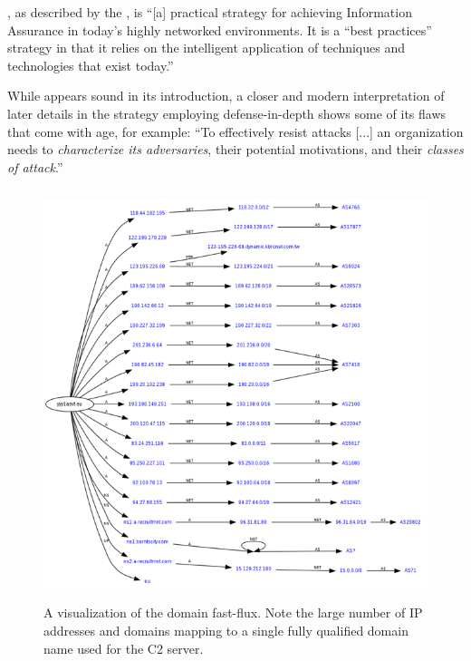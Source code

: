 \documentclass[12pt,letterpaper,titlepage]{report}
\begin{document}
{\didlong \autocite{nsa}, as described by the \nsa, is
“[a] practical strategy for achieving Information Assurance in today's highly
networked environments.  It is a ``best practices'' strategy in that it relies on
the intelligent application of techniques and technologies that exist today.”

While \did appears sound in its introduction, a closer and modern
interpretation of later details in the \nsa strategy employing defense-in-depth
shows some of its flaws that come with age, for example: ``To effectively resist
attacks [...] an organization needs to \emph{characterize its adversaries}, their
potential motivations, and their \emph{classes of attack}.''

\begin{figure}[h!]
	\centering
  \includegraphics[height=12cm]{./fastflux.png}
  \caption{A visualization of the domain fast-flux. Note the large
  number of IP addresses and domains mapping to a single fully qualified
  domain name used for the C2 server.}
\end{figure}

}
\end{document}
